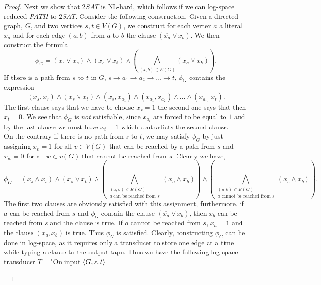 \documentclass[a4paper,11pt]{article}
\numberwithin{equation}{section}
\begin{document}
\begin{proof}
			Next we show that $ 2SAT $ is NL-hard, which follows if we can log-space reduced $ PATH $ to $ 2SAT $. Consider the following construction. Given a directed graph, $ G $, and two vertices $ s,t\in V(G) $, we construct for each vertex $ a $ a literal $ x_a $ and for each edge $ (a,b) $ from $ a $ to $ b $ the clause $ (\overline{x_a}\vee x_b) $. We then construct the formula\begin{equation*}
			\phi_G=(x_s\vee x_s)\wedge(\overline{x_s}\vee \overline{x_t})\wedge\left(\bigwedge_{(a,b)\in E(G)}(\overline{x_a}\vee x_b)\right).
			\end{equation*}
			If there is a path from $ s $ to $ t $ in $ G $, $ s\to a_1\to a_2\to...\to t  $, $ \phi_G $ contains the expression \begin{equation*}
			(x_s,x_s)\wedge(\overline{x_s}\vee \overline{x_t})\wedge(\overline{x_s},x_{a_1})\wedge(\overline{x_{a_1}},x_{a_2})\wedge...\wedge(\overline{x_{a_n}},x_t).
			\end{equation*} 
			The first clause says that we have to choose $ x_s=1 $ the second one says that then $ x_t=0 $. We see that $ \phi_G $ is \emph{not} satisfiable, since $ x_{a_i} $ are forced to be equal to $ 1 $ and by the last clause we must have $ x_t=1 $ which contradicts the second clause.\\
			On the contrary if there is no path from $ s $ to $ t $, we may satisfy $ \phi_G $ by just assigning $ x_v=1 $ for all $ v\in V(G) $ that can be reached by a path from $ s $ and $ x_w=0$ for all $ w\in v(G) $ that cannot be reached from $ s $. Clearly we have,
			\begin{equation*}
			\phi_G=(x_s\wedge x_s)\wedge(\overline{x_s}\vee \overline{x_t})\wedge\left(\bigwedge_{\substack{(a,b)\in E(G)\\a \text{ can be reached from }s}}(\overline{x_a}\wedge x_b)\right)\wedge\left(\bigwedge_{\substack{(a,b)\in E(G)\\a \text{ cannot be reached from }s}}(\overline{x_a}\wedge x_b)\right).
			\end{equation*}
			The first two clauses are obviously satisfied with this assignment, furthermore, if $ a $ can be reached from $ s $ and $ \phi_G $ contain the clause $ (\overline{x_a}\vee x_b ) $, then $ x_b $ can be reached from $ s $ and the clause is true. If $ a $ cannot be reached from $ s $, $ \overline{x_a}=1 $ and the clause $ (\overline{x_a},x_b) $ is true. Thus $ \phi_G $ is satisfied. 
			Clearly, constructing $ \phi_G $ can be done in log-space, as it requires only a transducer to store one edge at a time while typing a clause to the output tape. Thus we have the following log-space transducer $ T= $"On input $ \braket{G,s,t} $\begin{enumerate}

\end{enumerate}
\end{proof}
\end{document}
